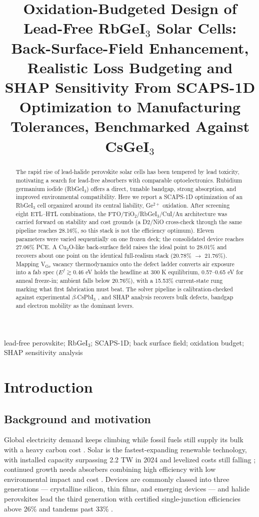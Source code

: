 \documentclass[review]{elsarticle}
\begin{document}
\begin{frontmatter}

\title{Oxidation-Budgeted Design of Lead-Free RbGeI$_{3}$ Solar Cells: Back-Surface-Field Enhancement, Realistic Loss Budgeting and SHAP Sensitivity From SCAPS-1D Optimization to Manufacturing Tolerances, Benchmarked Against CsGeI$_{3}$}
\begin{abstract}
The rapid rise of lead-halide perovskite solar cells has been tempered by lead toxicity, motivating a search for lead-free absorbers with comparable optoelectronics. Rubidium germanium iodide (RbGeI$_{3}$) offers a direct, tunable bandgap, strong absorption, and improved environmental compatibility. Here we report a SCAPS-1D optimization of an RbGeI$_{3}$ cell organized around its central liability, Ge$^{2+}$ oxidation. After screening eight ETL--HTL combinations, the FTO/\allowbreak{}TiO$_{2}$/RbGeI$_{3}$/CuI/\allowbreak{}Au architecture was carried forward on stability and cost grounds (a D2/NiO cross-check through the same pipeline reaches 28.16\%, so this stack is not the efficiency optimum). Eleven parameters were varied sequentially on one frozen deck; the consolidated device reaches 27.06\% PCE. A Cu$_{2}$O-like back-surface field raises the ideal point to 28.01\% and recovers about one point on the identical full-realism stack (20.78\% $\rightarrow$ 21.76\%). Mapping V$_{\mathrm{Ge}}$ vacancy thermodynamics onto the defect ladder converts air exposure into a fab spec ($E^f\gtrsim0.46$ eV holds the headline at 300 K equilibrium, 0.57--0.65 eV for anneal freeze-in; ambient falls below 20.76\%), with a 15.53\% current-state rung marking what first fabrication must beat. The solver pipeline is calibration-checked against experimental $\beta$-CsPbI$_{3}$ \cite{rWang}, and SHAP analysis recovers bulk defects, bandgap and electron mobility as the dominant levers.
\end{abstract}
\begin{keyword}
lead-free perovskite; RbGeI$_{3}$; SCAPS-1D; back surface field; oxidation budget; SHAP sensitivity analysis
\end{keyword}
\end{frontmatter}


\section{Introduction}

\subsection{Background and motivation}
Global electricity demand keeps climbing while fossil fuels still supply its bulk with a heavy carbon cost \cite{r1,r2}. Solar is the fastest-expanding renewable technology, with installed capacity surpassing 2.2 TW in 2024 and levelized costs still falling \cite{r3}; continued growth needs absorbers combining high efficiency with low environmental impact and cost \cite{r4}. Devices are commonly classed into three generations --- crystalline silicon, thin films, and emerging devices --- and halide perovskites lead the third generation with certified single-junction efficiencies above 26\% and tandems past 33\% \cite{r3}.
\end{document}
